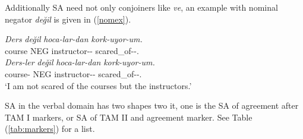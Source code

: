 Additionally SA need not only conjoiners like \textit{ve}, an example with nominal negator \textit{değil} is given in (\ref{nomex}).

\begin{exe}
    \ex \label{nomex4}
    \begin{xlist}
        \ex
        \gll 
        \textit{Ders} \textit{değil} \textit{hoca-lar-dan} \textit{kork-uyor-um.} \\ course NEG instructor-{\Pl}-{\Abl} scared\_of-{\Prog}-{\First}.{\Sg} \\

        \ex
        \gll 
        \textit{Ders-ler} \textit{değil} \textit{hoca-lar-dan} \textit{kork-uyor-um.} \\ course-{\Pl} NEG instructor-{\Pl}-{\Abl} scared\_of-{\Prog}-{\First}.{\Sg} \\
        \glt `I am not scared of the courses but the instructors.'
    
    \end{xlist}

\end{exe}

SA in the verbal domain has two shapes two it, one is the SA of agreement after TAM I markers, or SA of TAM II and agreement marker. See Table (\ref{tab:markers}) for a list.

